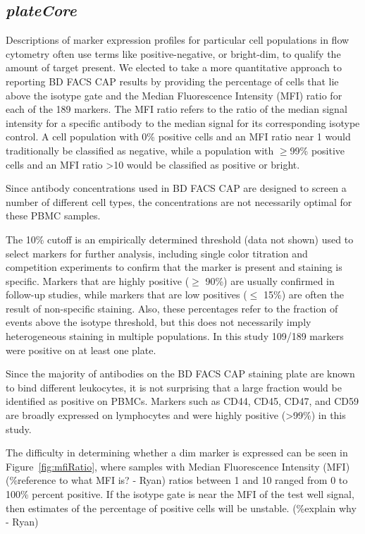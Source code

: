 \documentclass[12pt]{article}
\newcommand{\Rpackage}[1]{{\textit{#1}}}
\begin{document}
\subsection*{\Rpackage{plateCore}}

Descriptions of marker expression profiles for particular cell populations in
flow cytometry often use terms like positive-negative, or bright-dim, to
qualify the amount of target present. We elected to take a more quantitative
approach to reporting BD FACS CAP results by providing the percentage of cells
that lie above the isotype gate and the Median Fluorescence Intensity (MFI)
ratio for each of the 189 markers. The MFI ratio refers to the ratio of the
median signal intensity for a specific antibody to the median signal for its
corresponding isotype control. A cell population with 0\% positive cells and an
MFI ratio near 1 would traditionally be classified as negative, while a
population with $\ge$99\% positive cells and an MFI ratio >10 would be
classified as positive or bright. 

Since antibody concentrations used in BD FACS CAP are designed to screen a
number of different cell types, the concentrations are not necessarily optimal
for these PBMC samples. 


The 10\% cutoff is an empirically determined threshold (data not shown) used to select
markers for further analysis, including single color titration and competition
experiments to confirm that the marker is present and staining is specific.
Markers that are highly positive ($\ge$ 90\%) are usually confirmed in
follow-up studies, while markers that are low positives ($\le$ 15\%) are often
the result of non-specific staining. Also, these percentages refer to the
fraction of events above the isotype threshold, but this does not necessarily
imply heterogeneous staining in multiple populations. In this study 109/189
markers were positive on at least one plate.

Since the majority of antibodies on the BD FACS CAP staining plate are known to
bind different leukocytes, it is not surprising that a large fraction would be
identified as positive on PBMCs.  Markers such as CD44, CD45, CD47, and CD59
are broadly expressed on lymphocytes and were highly positive (>99\%) in this
study. 

The difficulty in determining whether a dim marker is expressed can be seen in
Figure~\ref{fig:mfiRatio}, where samples with Median Fluorescence Intensity
(MFI) (\%reference to what MFI is? - Ryan) ratios between 1 and 10 ranged from
0 to 100\% percent positive. If the isotype gate is near the MFI of the test
well signal, then estimates of the percentage of positive cells will be
unstable. (\%explain why - Ryan)
\end{document}
